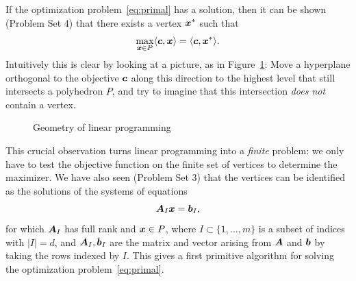 If the optimization problem~\eqref{eq:primal} has a solution, then it can be shown (Problem Set 4) that there exists a vertex $\bm{x}^*$ such that
\begin{equation*}
 \max_{\bm{x}\in P} \langle {\bm{c}}, {\bm{x}} \rangle = \langle {\bm{c}}, {\bm{x}^*} \rangle.
\end{equation*}
Intuitively this is clear by looking at a picture, as in Figure~\ref{fig:vertex}: Move a hyperplane orthogonal to the objective $\bm{c}$ along this direction to the highest level that still intersects a polyhedron $P$, and try to imagine that this intersection {\em does not} contain a vertex. 

\begin{figure}[h!]
\centering
{}
\caption{Geometry of linear programming} \label{fig:vertex}
\end{figure}

This crucial observation turns linear programming into a {\em finite} problem: we only have to test the objective function on the finite set of vertices to determine the maximizer. 
We have also seen (Problem Set 3) that the vertices can be identified as the solutions of the systems of equations
\begin{equation*}
 \bm{A}_I\bm{x}=\bm{b}_I,
\end{equation*}
for which $\bm{A}_I$ has full rank and $\bm{x}\in P$,
where $I\subset \{1,\dots,m\}$ is a subset of indices with $|I|=d$, and $\bm{A}_I,\bm{b}_I$ are the matrix and vector arising from $\bm{A}$ and $\bm{b}$ by taking the rows indexed by $I$. This gives a first primitive algorithm for solving the optimization problem~\eqref{eq:primal}. 

